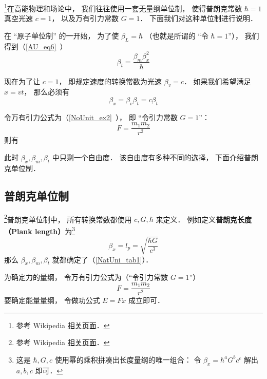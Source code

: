 
\begin{issues}
\issueDraft
\end{issues}


\footnote{参考 Wikipedia \href{https://en.wikipedia.org/wiki/Natural_units}{相关页面}．}在高能物理和场论中， 我们往往使用一套无量纲单位制， 使得普朗克常数 $\hbar = 1$ 真空光速 $c = 1$， 以及万有引力常数 $G = 1$． 下面我们对这种单位制进行说明．

在 “原子单位制” 的一开始， 为了使 $\beta_L = \hbar$ （也就是所谓的 “令 $\hbar = 1$”）， 我们得到（\autoref{AU_eq6}~）
\begin{equation}\label{NatUni_eq1}
\beta_t = \frac{\beta_m \beta_x^2}{\hbar}
\end{equation}

现在为了让 $c = 1$， 即规定速度的转换常数为光速 $\beta_v = c$． 如果我们希望满足 $x = vt$， 那么必须有
\begin{equation}
\beta_x = \beta_v \beta _t = c\beta_t
\end{equation}

令万有引力公式为（\autoref{NoUnit_ex2}~）， 即 “令引力常数 $G = 1$”：
\begin{equation}
F = \frac{m_1 m_2}{r^2}
\end{equation}
则有


此时 $\beta_x, \beta_m, \beta_t$ 中只剩一个自由度． 该自由度有多种不同的选择， 下面介绍普朗克单位制．

\subsection{普朗克单位制}
\footnote{参考 Wikipedia \href{https://en.wikipedia.org/wiki/Planck_units}{相关页面}．}普朗克单位制中， 所有转换常数都使用 $c, G, \hbar$ 来定义． 例如定义\textbf{普朗克长度（Plank length）}为\footnote{这是 $\hbar, G, c$ 使用幂的乘积拼凑出长度量纲的唯一组合： 令 $\beta_x = \hbar^a G^b c^c$ 解出 $a, b, c$ 即可．}
\begin{equation}
\beta_x = l_p = \sqrt{\frac{\hbar G}{c^3}}
\end{equation}
那么 $\beta_x, \beta_m, \beta_t$ 就都确定了（\autoref{NatUni_tab1}）．

为确定力的量纲， 令万有引力公式为（“令引力常数 $G = 1$”）
\begin{equation}
F = \frac{m_1 m_2}{r^2}
\end{equation}
要确定能量量纲， 令做功公式 $E = F x$ 成立即可．

